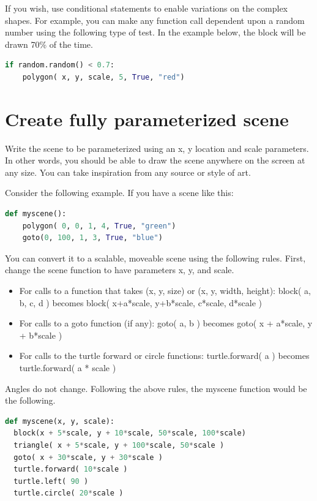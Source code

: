 \documentclass[12pt]{article}
\begin{document}
If you wish, use conditional statements to enable variations on the complex shapes. For example, you can make any function call dependent upon a random number using the following type of test. In the example below, the block will be drawn 70\% of the time.

\begin{lstlisting}[language=Python]
if random.random() < 0.7:
    polygon( x, y, scale, 5, True, "red")
\end{lstlisting}

\section{Create fully parameterized scene}
Write the scene to be parameterized using an x, y location and scale parameters. In other words, you should be able to draw the scene anywhere on the screen at any size. You can take inspiration from any source or style of art.

Consider the following example. If you have a scene like this:
\begin{lstlisting}[language=Python]
def myscene():
    polygon( 0, 0, 1, 4, True, "green")
    goto(0, 100, 1, 3, True, "blue")
\end{lstlisting}

You can convert it to a scalable, moveable scene using the following rules. First, change the scene function to have parameters x, y, and scale.

\begin{itemize}
  
\item For calls to a function that takes (x, y, size) or (x, y, width, height):
block( a, b, c, d ) becomes block( x+a*scale, y+b*scale, c*scale, d*scale )

\item For calls to a goto function (if any):
goto( a, b ) becomes goto( x + a*scale, y + b*scale )

\item For calls to the turtle forward or circle functions:
turtle.forward( a ) becomes turtle.forward( a * scale )
\end{itemize}

Angles do not change. Following the above rules, the myscene function would be the following.
\begin{lstlisting}[language=Python]
def myscene(x, y, scale):
  block(x + 5*scale, y + 10*scale, 50*scale, 100*scale)
  triangle( x + 5*scale, y + 100*scale, 50*scale )
  goto( x + 30*scale, y + 30*scale )
  turtle.forward( 10*scale )
  turtle.left( 90 ) 
  turtle.circle( 20*scale )
\end{lstlisting}
\end{document}
